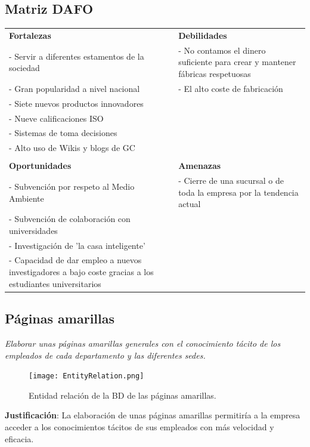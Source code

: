 \documentclass[twoside]{article}
\begin{document}
\subsection{Matriz DAFO}

\begin{table}[ht!]
	\centering
	\begin{tabular}{ p{6cm} | p{6cm} }
		\textbf{Fortalezas} & \textbf{Debilidades}\\
		- Servir a diferentes estamentos de la sociedad & - No contamos el dinero suficiente para crear y mantener fábricas respetuosas \\
		- Gran popularidad a nivel nacional & - El alto coste de fabricación  \\
		- Siete nuevos productos innovadores & \\
		- Nueve calificaciones ISO & \\
		- Sistemas de toma decisiones & \\
		- Alto uso de Wikis y blogs de GC & \\\hline\\
		\textbf{Oportunidades} & \textbf{Amenazas} \\
		- Subvención por respeto al Medio Ambiente & - Cierre de una sucursal o de toda la empresa por la tendencia actual\\
		- Subvención de colaboración con universidades & \\
		- Investigación de 'la casa inteligente' & \\
		- Capacidad de dar empleo a nuevos investigadores a bajo coste gracias a los estudiantes universitarios 
	\end{tabular}
\end{table}


\subsection{Páginas amarillas}
\label{sec:pAmarilla}
\textit{Elaborar unas páginas amarillas generales con el conocimiento tácito de los empleados de cada departamento y las diferentes sedes.}

\begin{figure}[ht!]
	\texttt{[image: EntityRelation.png]}
	\caption{Entidad relación de la BD de las páginas amarillas.}
	\label{fig:entiy relation}
\end{figure}

\textbf{Justificación}: La elaboración de unas páginas amarillas permitiría a la empresa acceder a los conocimientos tácitos de sus empleados con más velocidad y eficacia.
\end{document}
